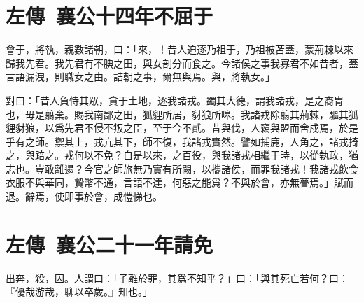 \theendnotes

\section[駒支不屈于晉\quad{\small 左傳 襄公十四年}]{{\normalsize 左傳\ 襄公十四年}\quad {}不屈于}
會于，將執，親數諸朝，曰：「來，！昔人迫逐乃祖于，乃祖被苫蓋，蒙荊棘以來歸我先君。我先君有不腆之田，與女剖分而食之。今諸侯之事我寡君不如昔者，蓋言語漏洩，則職女之由。詰朝之事，爾無與焉。與，將執女。」

對曰：「昔人負恃其眾，貪于土地，逐我諸戎。蠲其大德，謂我諸戎，是之裔冑也，毋是翦棄。賜我南鄙之田，狐貍所居，豺狼所嗥。我諸戎除翦其荊棘，驅其狐貍豺狼，以爲先君不侵不叛之臣，至于今不貳。昔與伐，人竊與盟而舍戍焉，於是乎有之師。禦其上，戎亢其下，師不復，我諸戎實然。譬如捕鹿，人角之，諸戎掎之，與踣之。戎何以不免？自是以來，之百役，與我諸戎相繼于時，以從執政，猶志也。豈敢離逷？今官之師旅無乃實有所闕，以攜諸侯，而罪我諸戎！我諸戎飲食衣服不與華同，贄幣不通，言語不達，何惡之能爲？不與於會，亦無瞢焉。」賦而退。辭焉，使即事於會，成愷悌也。

\theendnotes

\section[祁奚請免叔向\quad{\small 左傳\ 襄公二十一年}]{{\normalsize 左傳\ 襄公二十一年}\quad {}請免}
出奔，殺，囚。人謂曰：「子離於罪，其爲不知乎？」曰：「與其死亡若何？曰：『優哉游哉，聊以卒歲。』知也。」

